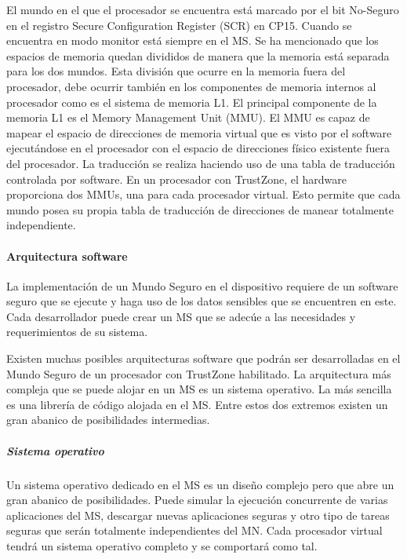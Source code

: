 El mundo en el que el procesador se encuentra está marcado por el bit No-Seguro en el registro Secure Configuration Register (SCR) en CP15. Cuando se encuentra en modo monitor está siempre en el MS.
Se ha mencionado que los espacios de memoria quedan divididos de manera que la memoria está separada para los dos mundos. Esta división que ocurre en la memoria fuera del procesador, debe ocurrir también en los componentes de memoria internos al procesador como es el sistema de memoria L1. El principal componente de la memoria L1 es el Memory Management Unit (MMU). El MMU es capaz de mapear el espacio de direcciones de memoria virtual que es visto por el software ejecutándose en el procesador con el espacio de direcciones físico existente fuera del procesador. La traducción se realiza haciendo uso de una tabla de traducción controlada por software.
En un procesador con TrustZone, el hardware proporciona dos MMUs, una para cada procesador virtual. Esto permite que cada mundo posea su propia tabla de traducción de direcciones de manear totalmente independiente.

\paragraph{Arquitectura software}

La implementación de un Mundo Seguro en el dispositivo requiere de un software seguro que se ejecute y haga uso de los datos sensibles que se encuentren en este. Cada desarrollador puede crear un MS que se adecúe a las necesidades y requerimientos de su sistema. \newline

Existen muchas posibles arquitecturas software que podrán ser desarrolladas en el Mundo Seguro de un procesador con TrustZone habilitado. La arquitectura más compleja que se puede alojar en un MS es un sistema operativo. La más sencilla es una librería de código alojada en el MS. Entre estos dos extremos existen un gran abanico de posibilidades intermedias.


\subparagraph{Sistema operativo} 
Un sistema operativo dedicado en el MS es un diseño complejo pero que abre un gran abanico de posibilidades. Puede simular la ejecución concurrente de varias aplicaciones del MS, descargar nuevas aplicaciones seguras y otro tipo de tareas seguras que serán totalmente independientes del MN. Cada procesador virtual tendrá un sistema operativo completo y se comportará como tal.

